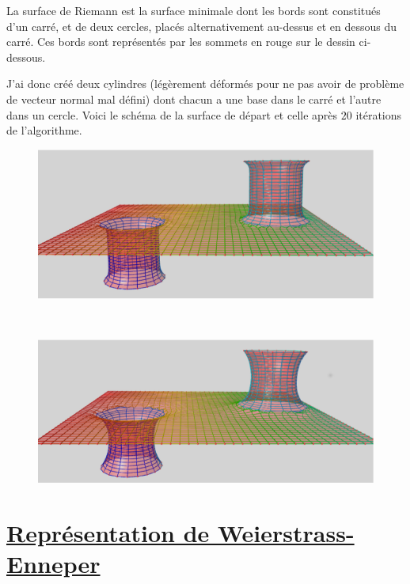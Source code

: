 \documentclass {report}
\begin{document}
La surface de Riemann est la surface minimale dont les bords sont constitués d'un carré, et de deux cercles, placés alternativement au-dessus et en dessous du carré. Ces bords sont représentés par les sommets en rouge sur le dessin ci-dessous.

J'ai donc créé deux cylindres (légèrement déformés pour ne pas avoir de problème de vecteur normal mal défini) dont chacun a une base dans le carré et l'autre dans un cercle. Voici le schéma de la surface de départ et celle après $20$ itérations de l'algorithme.\\

\begin{figure}[ht!]
      \centering \includegraphics[scale=0.25]{Images_Fichiers/10.eps}
\end{figure}
\  \vspace{-1cm} \\
\begin{figure}[ht!]
      \centering \includegraphics[scale=0.25]{Images_Fichiers/11.eps}
\end{figure}

\chapter[Représentation de Weierstrass-Enneper]{\uline{Représentation de Weierstrass-Enneper}}
\end{document}
